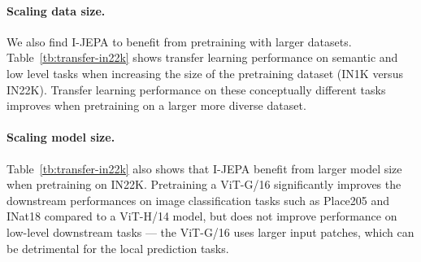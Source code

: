 \documentclass[10pt,twocolumn,letterpaper]{article}
\newcommand{\putalg}{{I-JEPA}\xspace}
\begin{document}
\paragraph{Scaling data size.}
We also find \putalg to benefit from pretraining with larger datasets.
Table~\ref{tb:transfer-in22k} shows transfer learning performance on semantic  and low level tasks when increasing the size of the pretraining dataset (IN1K versus IN22K).
Transfer learning performance on these conceptually different tasks improves when pretraining on a larger more diverse dataset.

\paragraph{Scaling model size.}
Table~\ref{tb:transfer-in22k} also shows that \putalg benefit from larger model size when pretraining on IN22K. Pretraining a ViT-G/16 significantly improves the downstream performances on image classification tasks such as Place205 and INat18 compared to a ViT-H/14 model, but does not improve performance on low-level downstream tasks --- the ViT-G/16 uses larger input patches, which can be detrimental for the local prediction tasks.
\end{document}
